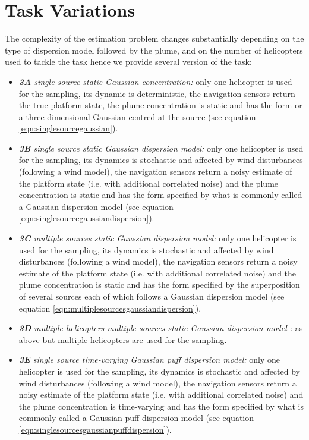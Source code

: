 \documentclass[a4paper,11pt]{report}
\begin{document}
\section{Task Variations}  \label{PlumeVariations}
The complexity of the estimation problem changes substantially depending on the type of dispersion model followed by the plume, and on the number of helicopters used to tackle the task hence we provide several version of the task:
\begin{itemize}
\item \textit{\textbf{3A} single source static Gaussian concentration:} only one helicopter is used for the sampling, its dynamic is deterministic, the navigation sensors return the true platform state, the plume concentration is static and has the form or a three dimensional Gaussian centred at the source (see equation \ref{eqn:singlesourcegaussian}).

\item \textit{\textbf{3B} single source static Gaussian dispersion model:} only one helicopter is used for the sampling, its dynamics is stochastic and affected by wind disturbances (following a wind model), the navigation sensors return a noisy estimate of the platform state (i.e. with additional correlated noise) and the plume concentration is static and has the form specified by what is commonly called a Gaussian dispersion model (see equation \ref{eqn:singlesourcegaussiandispersion}).

\item \textit{\textbf{3C} multiple sources static Gaussian dispersion model:} only one helicopter is used for the sampling, its dynamics is stochastic and affected by wind disturbances (following a wind model), the navigation sensors return a noisy estimate of the platform state (i.e. with additional correlated noise) and the plume concentration is static and has the form specified by the superposition of several sources each of which follows a Gaussian dispersion model (see equation \ref{eqn:multiplesourcesgaussiandispersion}).

\item \textit{\textbf{3D} multiple helicopters multiple sources static Gaussian dispersion model :} as above but multiple helicopters are used for the sampling.

\item \textit{\textbf{3E} single source time-varying Gaussian puff dispersion model:} only one helicopter is used for the sampling, its dynamics is stochastic and affected by wind disturbances (following a wind model), the navigation sensors return a noisy estimate of the platform state (i.e. with additional correlated noise) and the plume concentration is time-varying and has the form specified by what is commonly called a Gaussian puff dispersion model (see equation \ref{eqn:singlesourcesgaussianpuffdispersion}).


\end{itemize}
\end{document}
